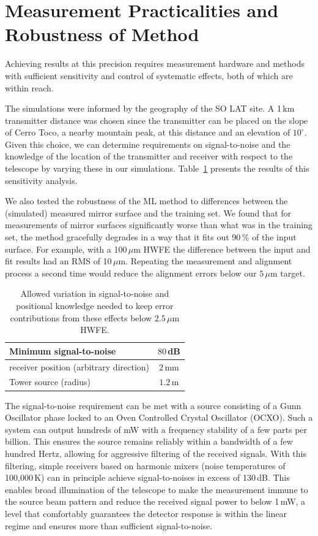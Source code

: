 \section{Measurement Practicalities and Robustness of Method}
\label{sec:meas_method}
Achieving results at this precision requires measurement hardware and methods with sufficient sensitivity and control of systematic effects, both of which are within reach.

The simulations were informed by the geography of the SO LAT site.  A 1\,km transmitter distance was chosen since the transmitter can be placed on the slope of Cerro Toco, a nearby mountain peak, at this distance and an elevation of $10^\circ$.  Given this choice, we can determine requirements on signal-to-noise and the knowledge of the location of the transmitter and receiver with respect to the telescope by varying these in our simulations.  Table~\ref{tab:tols} presents the results of this sensitivity analysis. 

We also tested the robustness of the ML method to differences between the (simulated) measured mirror surface and the training set.  We found that for measurements of mirror surfaces significantly worse than what was in the training set, the method gracefully degrades in a way that it fits out 90\,\% of the input surface.  For example, with a 100\,$\mu$m HWFE the difference between the input and fit results had an RMS of 10\,$\mu$m.  Repeating the measurement and alignment process a second time would reduce the alignment errors below our $5\,\mu$m target. 

\begin{table}[!b]
\centering

\begin{tabular}{|l|c|}
\hline
Minimum signal-to-noise & $80$\,dB\\
\hline
receiver position (arbitrary direction) & $2$\,mm \\
\hline
Tower source (radius) & $1.2$\,m \\
\hline
\end{tabular}
\caption{Allowed variation in signal-to-noise and positional knowledge needed to keep error contributions from these effects  below $2.5\,\mu$m HWFE.}
  \label{tab:tols}
\end{table}

The signal-to-noise requirement can be met with a source consisting of a Gunn Oscillator phase locked to an Oven Controlled Crystal Oscillator (OCXO).  Such a system can output hundreds of mW with a frequency stability of a few parts per billion.  This ensures the source remains reliably within a bandwidth of a few hundred Hertz, allowing for aggressive filtering of the received signals.  With this filtering, simple receivers based on harmonic mixers (noise temperatures of 100,000\,K) can in principle achieve signal-to-noises in excess of 130\,dB.  This enables broad illumination of the telescope to make the measurement immune to the source beam pattern and reduce the received signal power to below 1\,mW, a level that comfortably guarantees the detector response is within the linear regime and ensures more than sufficient signal-to-noise.

